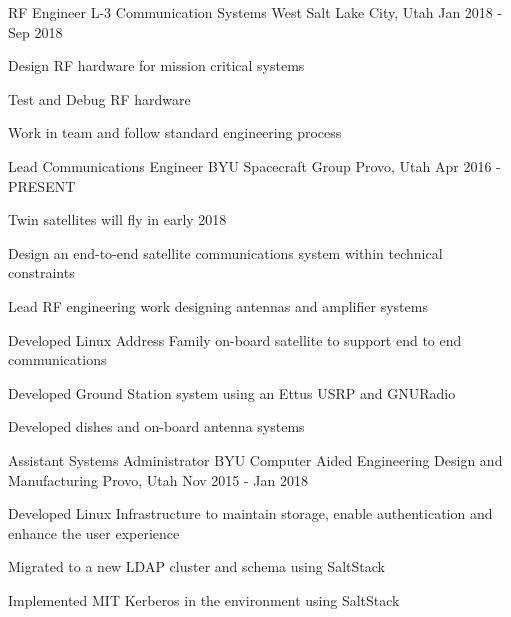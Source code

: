 

\begin{cventries}
    \cventry
    {RF Engineer} %
    {L-3 Communication Systems West} %
    {Salt Lake City, Utah} %
    {Jan 2018 - Sep 2018} %
    {
        \begin{cvitems} %
        \item {Design RF hardware for mission critical systems}
        \item {Test and Debug RF hardware}
        \item {Work in team and follow standard engineering process}
        \end{cvitems}
    }

    \cventry
    {Lead Communications Engineer} %
    {BYU Spacecraft Group} %
    {Provo, Utah} %
    {Apr 2016 - PRESENT} %
    {
        \begin{cvitems} %
        \item {Twin satellites will fly in early 2018}
        \item {Design an end-to-end satellite communications system within technical constraints}
        \item {Lead RF engineering work designing antennas and amplifier systems}
        \item {Developed Linux Address Family on-board satellite to support end to end communications}
        \item {Developed Ground Station system using an Ettus USRP and GNURadio}
        \item {Developed dishes and on-board antenna systems}
        \end{cvitems}
    }

    \cventry
    {Assistant Systems Administrator} %
    {BYU Computer Aided Engineering Design and Manufacturing} %
    {Provo, Utah} %
    {Nov 2015 - Jan 2018} %
    {
        \begin{cvitems} %
        \item {Developed Linux Infrastructure to maintain storage, enable authentication and enhance the user experience}
        \item {Migrated to a new LDAP cluster and schema using SaltStack}
        \item {Implemented MIT Kerberos in the environment using SaltStack}
        \end{cvitems}
    }


\end{cventries}
